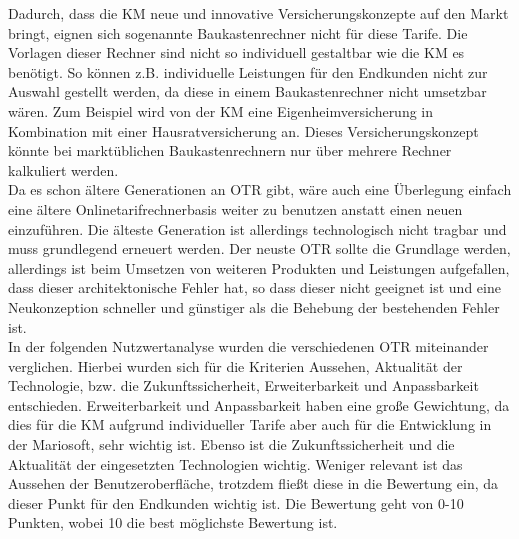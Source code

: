 Dadurch, dass die \ac{KM} neue und innovative Versicherungskonzepte auf den Markt bringt, eignen sich sogenannte Baukastenrechner nicht für diese Tarife. Die Vorlagen dieser Rechner sind nicht so individuell gestaltbar wie die \ac{KM} es benötigt. So können z.B. individuelle Leistungen für den Endkunden nicht zur Auswahl gestellt werden, da diese in einem Baukastenrechner nicht umsetzbar wären. Zum Beispiel wird von der \ac{KM} eine Eigenheimversicherung in Kombination mit einer Hausratversicherung an. Dieses Versicherungskonzept könnte bei marktüblichen Baukastenrechnern nur über mehrere Rechner kalkuliert werden.\\
Da es schon ältere Generationen an \ac{OTR} gibt, wäre auch eine Überlegung einfach eine ältere Onlinetarifrechnerbasis weiter zu benutzen anstatt einen neuen einzuführen. Die älteste Generation ist allerdings technologisch nicht tragbar und muss grundlegend erneuert werden. Der neuste \ac{OTR} sollte die Grundlage werden, allerdings ist beim Umsetzen von weiteren Produkten und Leistungen aufgefallen, dass dieser architektonische Fehler hat, so dass dieser nicht geeignet ist und eine Neukonzeption schneller und günstiger als die Behebung der bestehenden Fehler ist.\\
In der folgenden Nutzwertanalyse wurden die verschiedenen \ac{OTR} miteinander verglichen. Hierbei wurden sich für die Kriterien Aussehen, Aktualität der Technologie, bzw. die Zukunftssicherheit, Erweiterbarkeit und Anpassbarkeit entschieden. Erweiterbarkeit und Anpassbarkeit haben eine große Gewichtung, da dies für die \ac{KM} aufgrund individueller Tarife aber auch für die Entwicklung in der Mariosoft, sehr wichtig ist. Ebenso ist die Zukunftssicherheit und die Aktualität der eingesetzten Technologien wichtig. Weniger relevant ist das Aussehen der Benutzeroberfläche, trotzdem fließt diese in die Bewertung ein, da dieser Punkt für den Endkunden wichtig ist. Die Bewertung geht von 0-10 Punkten, wobei 10 die best möglichste Bewertung ist.\\
\\


